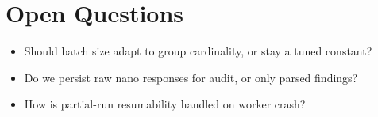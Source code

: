 \section{Open Questions}
\begin{itemize}[leftmargin=1.2em]
  \item Should batch size adapt to group cardinality, or stay a tuned constant?
  \item Do we persist raw nano responses for audit, or only parsed findings?
  \item How is partial-run resumability handled on worker crash?
\end{itemize}


